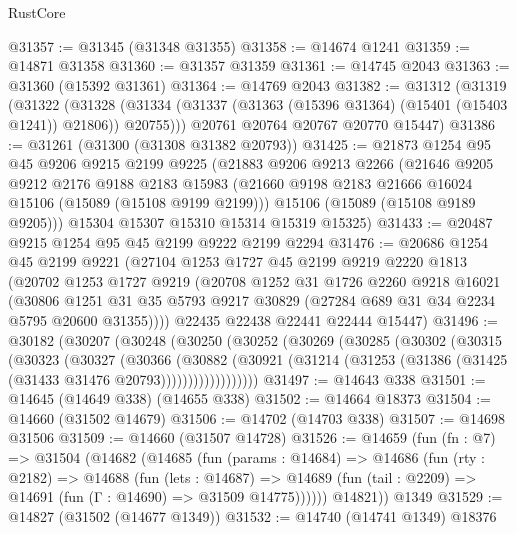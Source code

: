 \begin{lexlean}{RustCore}
\begin{coremodule}
@31357 := @31345 (@31348 @31355)
@31358 := @14674 @1241
@31359 := @14871 @31358
@31360 := @31357 @31359
@31361 := @14745 @2043
@31363 := @31360 (@15392 @31361)
@31364 := @14769 @2043
@31382 := @31312
    (@31319
      (@31322
        (@31328 (@31334 (@31337 (@31363 (@15396 @31364) (@15401 (@15403 @1241)) @21806)) @20755)))
      @20761
      @20764
      @20767
      @20770
      @15447)
@31386 := @31261 (@31300 (@31308 @31382 @20793))
@31425 := @21873
    @1254
    @95
    @45
    @9206
    @9215
    @2199
    @9225
    (@21883
      @9206
      @9213
      @2266
      (@21646
        @9205
        @9212
        @2176
        @9188
        @2183
        @15983
        (@21660 @9198 @2183 @21666 @16024 @15106 (@15089 (@15108 @9199 @2199)))
        @15106
        (@15089 (@15108 @9189 @9205)))
      @15304
      @15307
      @15310
      @15314
      @15319
      @15325)
@31433 := @20487 @9215 @1254 @95 @45 @2199 @9222 @2199 @2294
@31476 := @20686
    @1254
    @45
    @2199
    @9221
    (@27104
      @1253
      @1727
      @45
      @2199
      @9219
      @2220
      @1813
      (@20702
        @1253
        @1727
        @9219
        (@20708
          @1252
          @31
          @1726
          @2260
          @9218
          @16021
          (@30806
            @1251
            @31
            @35
            @5793
            @9217
            @30829
            (@27284 @689 @31 @34 @2234 @5795 @20600 @31355))))
      @22435
      @22438
      @22441
      @22444
      @15447)
@31496 := @30182
    (@30207
      (@30248
        (@30250
          (@30252
            (@30269
              (@30285
                (@30302
                  (@30315
                    (@30323
                      (@30327
                        (@30366
                          (@30882
                            (@30921
                              (@31214
                                (@31253 (@31386 (@31425 (@31433 @31476 @20793))))))))))))))))))
@31497 := @14643 @338
@31501 := @14645 (@14649 @338) (@14655 @338)
@31502 := @14664 @18373
@31504 := @14660 (@31502 @14679)
@31506 := @14702 (@14703 @338)
@31507 := @14698 @31506
@31509 := @14660 (@31507 @14728)
@31526 := @14659
    (fun (fn : @7) =>
    @31504
      (@14682
        (@14685
          (fun (params : @14684) =>
          @14686
            (fun (rty : @2182) =>
            @14688
              (fun (lets : @14687) =>
              @14689 (fun (tail : @2209) => @14691 (fun (Γ : @14690) => @31509 @14775))))))
        @14821))
    @1349
@31529 := @14827 (@31502 (@14677 @1349))
@31532 := @14740 (@14741 @1349) @18376

\end{coremodule}
\end{lexlean}

